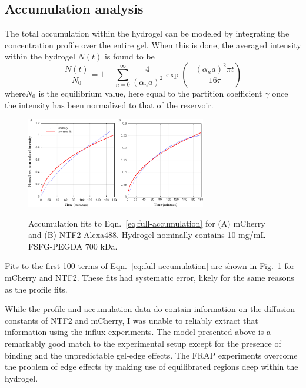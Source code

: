 \subsection{Accumulation analysis}

The total accumulation within the hydrogel can be modeled by integrating the concentration profile over the entire gel.  When this is done, the averaged intensity within the hydrogel $N(t)$ is found to be
\begin{equation}
\frac{N(t)}{N_0} = 1-\sum_{n=0}^\infty \frac{4}{(\alpha_na)^2}\exp\left(-\frac{(\alpha_na)^2\pi t}{16\tau}\right)
\label{eq:full-accumulation}
\end{equation} where$N_0$ is the equilibrium value, here equal to the partition coefficient $\gamma$ once the intensity has been normalized to that of the reservoir.

\begin{figure}
\caption[Fits to accumulation curves.]{Accumulation fits to Eqn.~\ref{eq:full-accumulation} for (A) mCherry and (B) NTF2-Alexa488.  Hydrogel nominally contains 10 mg/mL FSFG-PEGDA 700 kDa.\\}
\centering
\includegraphics[width=0.7\textwidth]{figs/ch04/accumulation.pdf}
\label{fig:acc}
\end{figure} 


Fits to the first 100 terms of Eqn.~\ref{eq:full-accumulation} are shown in Fig.~\ref{fig:acc} for mCherry and NTF2.  These fits had systematic error, likely for the same reasons as the profile fits.

While the profile and accumulation data do contain information on the diffusion constants of NTF2 and mCherry, I was unable to reliably extract that information using the influx experiments.  The model presented above is a remarkably good match to the experimental setup except for the presence of binding and the unpredictable gel-edge effects.  The FRAP experiments overcome the problem of edge effects by making use of equilibrated regions deep within the hydrogel.

